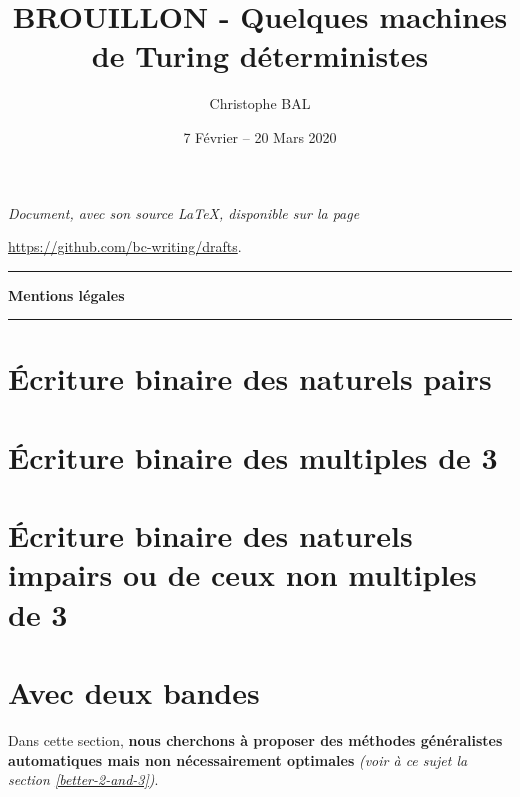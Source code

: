 \documentclass[a4paper, 12pt]{scrartcl}
\begin{document}
\title{BROUILLON - Quelques machines de Turing déterministes}
\author{Christophe BAL}
\date{7 Février -- 20 Mars 2020}

\maketitle

\begin{center}
	\itshape
	Document, avec son source \LaTeX, disponible sur la page
	
	\url{https://github.com/bc-writing/drafts}.
\end{center}


\bigskip


\begin{center}
	\hrule\vspace{.3em}
	{
		\fontsize{1.35em}{1em}\selectfont
		\textbf{Mentions \og légales \fg}
	}
			
	\vspace{0.45em}
	\doclicenseThis
	\hrule
\end{center}


\bigskip
\setcounter{tocdepth}{2}
\tableofcontents



\newpage
\section{Écriture binaire des naturels pairs}

	


\newpage
\section{Écriture binaire des multiples de 3} \label{divisibility-by-3}

	


\newpage
\section{Écriture binaire des naturels impairs ou de ceux non multiples de 3}

	


\newpage
\section{Avec deux bandes}

	Dans cette section, \textbf{nous cherchons à proposer des méthodes généralistes automatiques mais non nécessairement optimales}
	\emph{(voir à ce sujet la section \ref{better-2-and-3})}.
\end{document}
